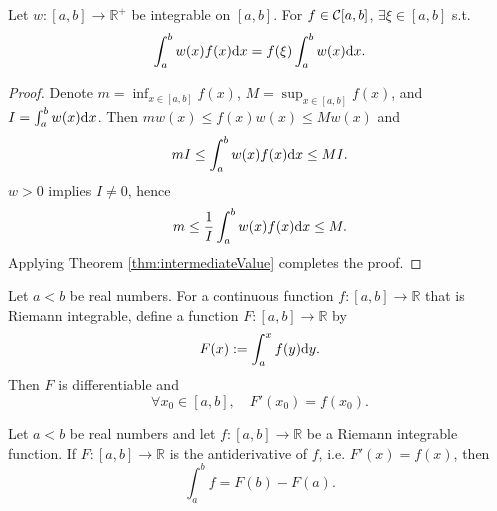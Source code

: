 \begin{thm}
  \label{thm:integralMeanValue}
  Let $w:[a,b]\rightarrow \mathbb{R}^+$
  be integrable on $[a,b]$. For $f\in {\cal C}[a,b]$,
  $\exists \xi\in[a,b]$ s.t.
  \begin{equation}
    \label{eq:integralMeanValue}
    \int_a^b w(x)f(x)\mathrm{d} x = f(\xi) \int_a^b w(x)\mathrm{d} x.
  \end{equation}
\end{thm}
\begin{proof}
  Denote $m=\inf_{x\in[a,b]} f(x)$, $M=\sup_{x\in[a,b]} f(x)$,
   and $I=\int_a^b w(x)\mathrm{d} x$.
  Then $m w(x)\le f(x)w(x) \le M w(x)$ and
  \begin{equation*}
    m I \le \int_a^b w(x) f(x) \mathrm{d} x \le M I.
  \end{equation*}
  $w>0$ implies $I\ne 0$, hence
  \begin{equation*}
    m \le \frac{1}{I}\int_a^b w(x) f(x) \mathrm{d} x \le M.
  \end{equation*}
  Applying Theorem \ref{thm:intermediateValue}
   completes the proof.
\end{proof}

\begin{thm}
  \label{thm:fundamentalThmCalculus1}
  Let $a<b$ be real numbers.
  For a continuous function $f: [a,b]\rightarrow \mathbb{R}$
  that is Riemann integrable, 
  define a function $F: [a,b]\rightarrow \mathbb{R}$ by
  \begin{equation}
    \label{eq:integralOfRiemannIntF}
    F(x) := \int_a^x f(y) \mathrm{d} y.
  \end{equation}
  Then $F$ is differentiable and
  \begin{equation}
    \label{eq:fundamentalThmCalculus1}
    \forall x_0\in [a,b], \quad
    F'(x_0) = f(x_0).
  \end{equation}
\end{thm}

\begin{thm}
  \label{thm:fundamentalThmCalculus2}
  Let $a<b$ be real numbers
  and let $f: [a,b]\rightarrow \mathbb{R}$
  be a Riemann integrable function.
  If $F:[a,b]\rightarrow\mathbb{R}$ is the antiderivative of $f$,
  i.e. $F'(x)=f(x)$,
  then
  \begin{equation}
    \label{eq:fundamentalThmCalculus2}
    \int_a^b f = F(b) - F(a).
  \end{equation}
\end{thm}


